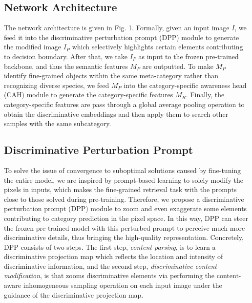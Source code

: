 \documentclass[letterpaper]{article} %
\begin{document}
\subsection{Network Architecture}
The network architecture is given in Fig. 1.
Formally, given an input image $ I $, we feed it into the discriminative perturbation prompt (DPP) module to generate the modified image $ I_P $ which selectively highlights certain elements contributing to decision boundary. After that, we take $ I_P $ as input to the frozen pre-trained backbone, and thus the semantic features $ M_P $ are outputted.
To make $M_P$ identify fine-grained objects within the same meta-category rather than recognizing diverse species, we feed $ M_P $ into the category-specific awareness head (CAH) module to generate the category-specific features $ M_R $.  Finally, the category-specific features are pass through a global average pooling operation to obtain the discriminative embeddings and then apply them to search other samples with the same subcategory. %






\subsection{Discriminative Perturbation Prompt}
To solve the issue of convergence to suboptimal solutions caused by fine-tuning the entire model, we are inspired by prompt-based learning to solely modify the pixels in inputs, which makes the fine-grained retrieval task with the prompts close to those solved during pre-training.
Therefore, we propose a discriminative perturbation prompt (DPP) module to zoom and even exaggerate some elements contributing to category prediction in the pixel space. In this way, DPP can steer the frozen pre-trained model with this perturbed prompt to perceive much more discriminative details, thus bringing the high-quality representation.
Concretely, DPP consists of two steps. The first step, \textit{content parsing}, is to learn a discriminative projection map which reflects the location and intensity of discriminative information, and the second step, \textit{discriminative content modification}, is that zooms discriminative elements via performing the content-aware inhomogeneous sampling operation on each input image under the guidance of the discriminative projection map.
\end{document}
